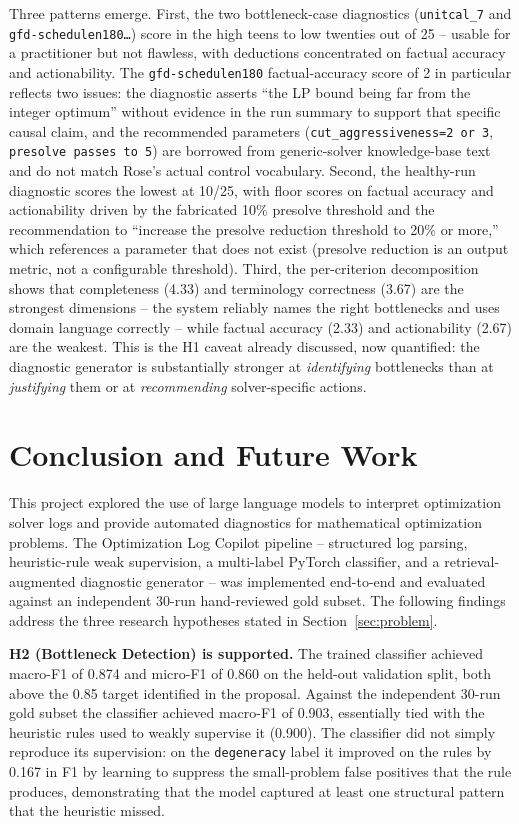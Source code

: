 \documentclass[11pt]{article}
\begin{document}
Three patterns emerge. First, the two bottleneck-case diagnostics (\texttt{unitcal\_7} and \texttt{gfd-schedulen180\ldots}) score in the high teens to low twenties out of 25 -- usable for a practitioner but not flawless, with deductions concentrated on factual accuracy and actionability. The \texttt{gfd-schedulen180} factual-accuracy score of 2 in particular reflects two issues: the diagnostic asserts ``the LP bound being far from the integer optimum'' without evidence in the run summary to support that specific causal claim, and the recommended parameters (\texttt{cut\_aggressiveness=2 or 3}, \texttt{presolve passes to 5}) are borrowed from generic-solver knowledge-base text and do not match Rose's actual control vocabulary. Second, the healthy-run diagnostic scores the lowest at 10/25, with floor scores on factual accuracy and actionability driven by the fabricated 10\% presolve threshold and the recommendation to ``increase the presolve reduction threshold to 20\% or more,'' which references a parameter that does not exist (presolve reduction is an output metric, not a configurable threshold). Third, the per-criterion decomposition shows that completeness (4.33) and terminology correctness (3.67) are the strongest dimensions -- the system reliably names the right bottlenecks and uses domain language correctly -- while factual accuracy (2.33) and actionability (2.67) are the weakest. This is the H1 caveat already discussed, now quantified: the diagnostic generator is substantially stronger at \emph{identifying} bottlenecks than at \emph{justifying} them or at \emph{recommending} solver-specific actions.

\section{Conclusion and Future Work}
\label{sec:conclusion}

This project explored the use of large language models to interpret optimization solver logs and provide automated diagnostics for mathematical optimization problems. The Optimization Log Copilot pipeline -- structured log parsing, heuristic-rule weak supervision, a multi-label PyTorch classifier, and a retrieval-augmented diagnostic generator -- was implemented end-to-end and evaluated against an independent 30-run hand-reviewed gold subset. The following findings address the three research hypotheses stated in Section~\ref{sec:problem}.

\textbf{H2 (Bottleneck Detection) is supported.} The trained classifier achieved macro-F1 of 0.874 and micro-F1 of 0.860 on the held-out validation split, both above the 0.85 target identified in the proposal. Against the independent 30-run gold subset the classifier achieved macro-F1 of 0.903, essentially tied with the heuristic rules used to weakly supervise it (0.900). The classifier did not simply reproduce its supervision: on the \texttt{degeneracy} label it improved on the rules by 0.167 in F1 by learning to suppress the small-problem false positives that the rule produces, demonstrating that the model captured at least one structural pattern that the heuristic missed.
\end{document}
